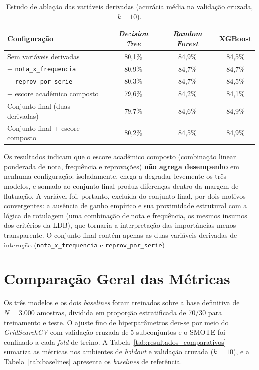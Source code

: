 \begin{table}[htb]
\centering
\caption{Estudo de ablação das variáveis derivadas (acurácia média na validação cruzada, $k=10$).}
\label{tab:ablation}
\small
\begin{tabular}{p{5.4cm}ccc}
\toprule
\textbf{Configuração} & \textbf{\textit{Decision Tree}} & \textbf{\textit{Random Forest}} & \textbf{XGBoost} \\
\midrule
Sem variáveis derivadas & 80,1\% & 84,9\% & 84,5\% \\
+ \texttt{nota\_x\_frequencia} & 80,9\% & 84,7\% & 84,7\% \\
+ \texttt{reprov\_por\_serie} & 80,3\% & 84,7\% & 84,5\% \\
+ escore acadêmico composto & 79,6\% & 84,2\% & 84,1\% \\
Conjunto final (duas derivadas) & 79,7\% & 84,6\% & 84,9\% \\
Conjunto final + escore composto & 80,2\% & 84,5\% & 84,9\% \\
\bottomrule
\end{tabular}
\end{table}

Os resultados indicam que o escore acadêmico composto (combinação linear ponderada de nota, frequência e reprovações) \textbf{não agrega desempenho} em nenhuma configuração: isoladamente, chega a degradar levemente os três modelos, e somado ao conjunto final produz diferenças dentro da margem de flutuação. A variável foi, portanto, excluída do conjunto final, por dois motivos convergentes: a ausência de ganho empírico e sua proximidade estrutural com a lógica de rotulagem (uma combinação de nota e frequência, os mesmos insumos dos critérios da LDB), que tornaria a interpretação das importâncias menos transparente. O conjunto final contém apenas as duas variáveis derivadas de interação (\texttt{nota\_x\_frequencia} e \texttt{reprov\_por\_serie}).

\section{Comparação Geral das Métricas}

Os três modelos e os dois \textit{baselines} foram treinados sobre a base definitiva de $N=3.000$ amostras, dividida em proporção estratificada de 70/30 para treinamento e teste. O ajuste fino de hiperparâmetros deu-se por meio do \textit{GridSearchCV} com validação cruzada de 5 subconjuntos e o SMOTE foi confinado a cada \textit{fold} de treino. A Tabela~\ref{tab:resultados_comparativos} sumariza as métricas nos ambientes de \textit{holdout} e validação cruzada ($k=10$), e a Tabela~\ref{tab:baselines} apresenta os \textit{baselines} de referência.

